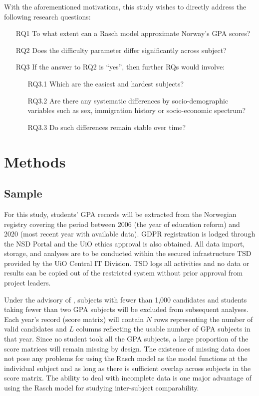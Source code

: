 \documentclass[
    a4paper,            %
    11pt,               %
    stu,                %
    donotrepeattitle,   %
    noextraspace,       %
    floatsintext,       %
    biblatex,           %
    colorlinks=true,        %
    linkcolor=red,          %
    anchorcolor=black,      %
    citecolor=blue,         %
    urlcolor=blue,          %
    bookmarks=true,         %
    bookmarksopen=false,    %
    bookmarksnumbered=true  %
]{apa7}
\begin{document}
With the aforementioned motivations, this study wishes to directly address the following research questions:
\begin{enumerate}
    \item[RQ1] To what extent can a Rasch model approximate Norway's GPA scores?
    \item[RQ2] Does the difficulty parameter differ significantly across subject?
    \item[RQ3] If the answer to RQ2 is ``yes'', then further RQs would involve:
        \begin{enumerate}
            \item[RQ3.1] Which are the easiest and hardest subjects?
            \item[RQ3.2] Are there any systematic differences by socio-demographic variables such as sex, immigration history or socio-economic spectrum?
            \item[RQ3.3] Do such differences remain stable over time?
        \end{enumerate}
\end{enumerate}

\section{Methods}

\subsection{Sample}

For this study, students' GPA records will be extracted from the Norwegian registry covering the period between 2006 (the year of education reform) and 2020 (most recent year with available data). GDPR registration is lodged through the NSD Portal and the UiO ethics approval is also obtained. All data import, storage, and analyses are to be conducted within the secured infrastructure TSD provided by the UiO Central IT Division. TSD logs all activities and no data or results can be copied out of the restricted system without prior approval from project leaders.

Under the advisory of \textcite{he:2015}, subjects with fewer than 1,000 candidates and students taking fewer than two GPA subjects will be excluded from subsequent analyses. Each year's record (score matrix) will contain $N$ rows representing the number of valid candidates and $L$ columns reflecting the usable number of GPA subjects in that year. Since no student took all the GPA subjects, a large proportion of the score matrices will remain missing by design. The existence of missing data does not pose any problems for using the Rasch model as the model functions at the individual subject and as long as there is sufficient overlap across subjects in the score matrix. The ability to deal with incomplete data is one major advantage of using the Rasch model for studying inter-subject comparability.
\end{document}
